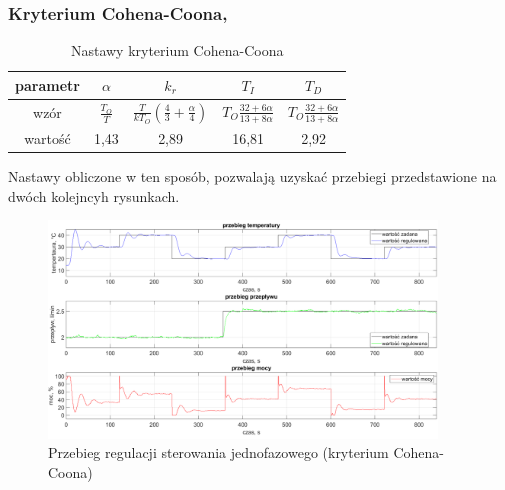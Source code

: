 \documentclass[a4paper,twoside,12pt]{book}
\begin{document}
\subsubsection{Kryterium Cohena-Coona, \cite{cohen1953theoretical}}
\begin{table}[h]
	\centering
	\caption{Nastawy kryterium Cohena-Coona}
	\label{id:tab:Cohen Conn}
	\renewcommand\cellalign{lc} %
	\setcellgapes{2.0ex} %

	\makegapedcells %
	\begin{tabular}{|c|c|c|c|c|}
		\hline
		parametr & $\alpha$                                    & $k_r$                                                           & $T_I$                                       & $T_D$ \\
		\hline
		wzór     & $\frac{T_O}{T}$                             & $\frac{T}{{k T_O}} \left(\frac{4}{3} + \frac{\alpha}{4}\right)$ & $T_O \frac{{32 + 6\alpha}}{{13 + 8\alpha}}$
		         & $T_O \frac{{32 + 6\alpha}}{{13 + 8\alpha}}$
		\\
		\hline
		wartość  & 1,43                                        & 2,89                                                            & 16,81                                       & 2,92  \\
		\hline
	\end{tabular}
\end{table}

\noindent Nastawy obliczone w ten sposób, pozwalają uzyskać przebiegi przedstawione na dwóch kolejncyh rysunkach.

\begin{figure}[h]
	\centering
	\includegraphics[width=0.92\textwidth]{./wykresy/png/regulation(CohenCoon)OnePhase.png}
	\caption{Przebieg regulacji sterowania jednofazowego (kryterium Cohena-Coona)}
	\label{fig:Cohen Coon jednofazowy}
\end{figure}
\end{document}
